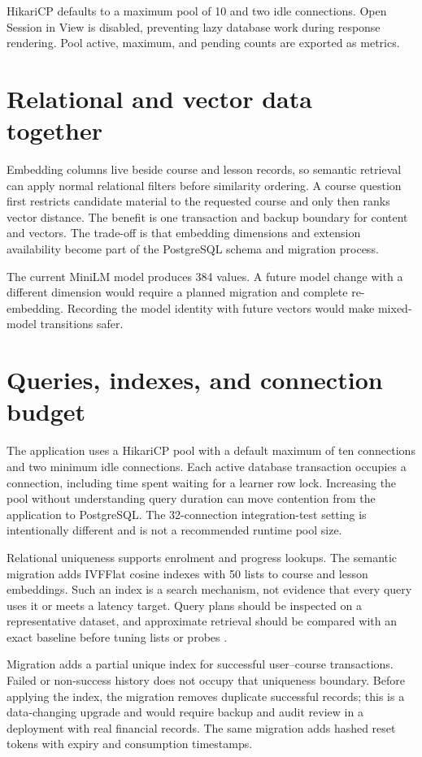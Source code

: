\documentclass[12pt,a4paper,oneside]{report}
\begin{document}
HikariCP defaults to a maximum pool of 10 and two idle connections. Open Session in
View is disabled, preventing lazy database work during response rendering. Pool
active, maximum, and pending counts are exported as metrics.

\section{Relational and vector data together}
Embedding columns live beside course and lesson records, so semantic retrieval can
apply normal relational filters before similarity ordering. A course question first
restricts candidate material to the requested course and only then ranks vector
distance. The benefit is one transaction and backup boundary for content and vectors.
The trade-off is that embedding dimensions and extension availability become part of
the PostgreSQL schema and migration process.

The current MiniLM model produces 384 values. A future model change with a different
dimension would require a planned migration and complete re-embedding. Recording the
model identity with future vectors would make mixed-model transitions safer.

\section{Queries, indexes, and connection budget}
The application uses a HikariCP pool with a default maximum of ten connections and
two minimum idle connections. Each active database transaction occupies a connection,
including time spent waiting for a learner row lock. Increasing the pool without
understanding query duration can move contention from the application to PostgreSQL.
The 32-connection integration-test setting is intentionally different and is not a
recommended runtime pool size.

Relational uniqueness supports enrolment and progress lookups. The semantic migration
adds IVFFlat cosine indexes with 50 lists to course and lesson embeddings. Such an
index is a search mechanism, not evidence that every query uses it or meets a latency
target. Query plans should be inspected on a representative dataset, and approximate
retrieval should be compared with an exact baseline before tuning lists or probes
\cite{pgvector}.

Migration  adds a
partial unique index for successful user--course transactions. Failed or non-success
history does not occupy that uniqueness boundary. Before applying the index, the
migration removes duplicate successful records; this is a data-changing upgrade and
would require backup and audit review in a deployment with real financial records.
The same migration adds hashed reset tokens with expiry and consumption timestamps.
\end{document}
